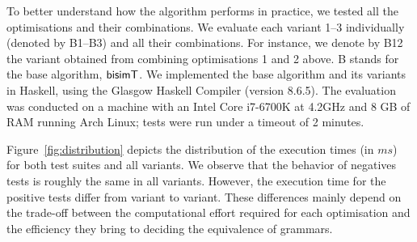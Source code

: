 To better understand how the algorithm performs in practice, we tested
all the optimisations and their combinations. We evaluate each variant 
1--3 individually (denoted
by B1--B3) and all their combinations. For instance, we denote by B12
the variant obtained from combining optimisations 1 and 2 above.
B stands for the base algorithm, $\mathsf{bisimT}$.
%
We implemented the base algorithm and its
variants %
in Haskell, using the Glasgow Haskell Compiler (version
8.6.5).
The evaluation was conducted on a machine with an Intel Core i7-6700K
at 4.2GHz and 8 GB of RAM running Arch Linux; tests were run under a
timeout of 2 minutes.

%

Figure~\ref{fig:distribution} depicts the distribution of the execution
times (in $ms$) for both test suites and all variants. We observe that 
the behavior of negatives tests is roughly the same in all variants. However,
the execution time for the positive tests differ from variant to variant. These
differences mainly depend on the trade-off between the computational
effort required for each optimisation and the efficiency they bring to
deciding the equivalence of grammars.

